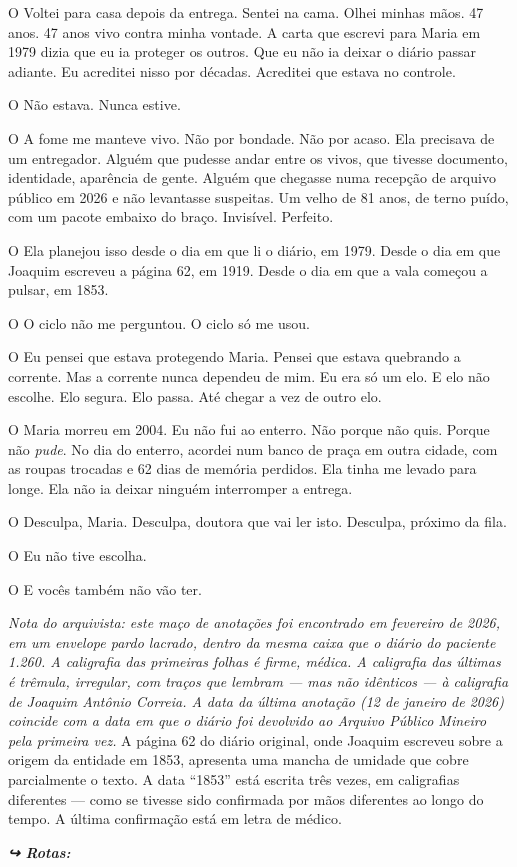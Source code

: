 \noindent O Voltei para casa depois da entrega. Sentei na cama. Olhei minhas mãos. 47 anos. 47 anos vivo contra minha vontade. A carta que escrevi para Maria em 1979 dizia que eu ia proteger os outros. Que eu não ia deixar o diário passar adiante. Eu acreditei nisso por décadas. Acreditei que estava no controle.

\noindent O Não estava. Nunca estive.

\noindent O A fome me manteve vivo. Não por bondade. Não por acaso. Ela precisava de um entregador. Alguém que pudesse andar entre os vivos, que tivesse documento, identidade, aparência de gente. Alguém que chegasse numa recepção de arquivo público em 2026 e não levantasse suspeitas. Um velho de 81 anos, de terno puído, com um pacote embaixo do braço. Invisível. Perfeito.

\noindent O Ela planejou isso desde o dia em que li o diário, em 1979. Desde o dia em que Joaquim escreveu a página 62, em 1919. Desde o dia em que a vala começou a pulsar, em 1853.

\noindent O O ciclo não me perguntou. O ciclo só me usou.

\noindent O Eu pensei que estava protegendo Maria. Pensei que estava quebrando a corrente. Mas a corrente nunca dependeu de mim. Eu era só um elo. E elo não escolhe. Elo segura. Elo passa. Até chegar a vez de outro elo.

\noindent O Maria morreu em 2004. Eu não fui ao enterro. Não porque não quis. Porque não \textit{pude}. No dia do enterro, acordei num banco de praça em outra cidade, com as roupas trocadas e 62 dias de memória perdidos. Ela tinha me levado para longe. Ela não ia deixar ninguém interromper a entrega.

\noindent O Desculpa, Maria. Desculpa, doutora que vai ler isto. Desculpa, próximo da fila.

\noindent O Eu não tive escolha.

\noindent O E vocês também não vão ter.

\noindent \textit{Nota do arquivista: este maço de anotações foi encontrado em fevereiro de 2026, em um envelope pardo lacrado, dentro da mesma caixa que o diário do paciente 1.260. A caligrafia das primeiras folhas é firme, médica. A caligrafia das últimas é trêmula, irregular, com traços que lembram --- mas não idênticos --- à caligrafia de Joaquim Antônio Correia. A data da última anotação (12 de janeiro de 2026) coincide com a data em que o diário foi devolvido ao Arquivo Público Mineiro pela primeira vez.}
\noindent A página 62 do diário original, onde Joaquim escreveu sobre a origem da entidade em 1853, apresenta uma mancha de umidade que cobre parcialmente o texto. A data \textquotedblleft{}1853\textquotedblright{} está escrita três vezes, em caligrafias diferentes --- como se tivesse sido confirmada por mãos diferentes ao longo do tempo. A última confirmação está em letra de médico.

\vspace{0.5em}
\noindent\textit{\textbf{↪ Rotas:}  \rotasep {} \rotasep {}}
